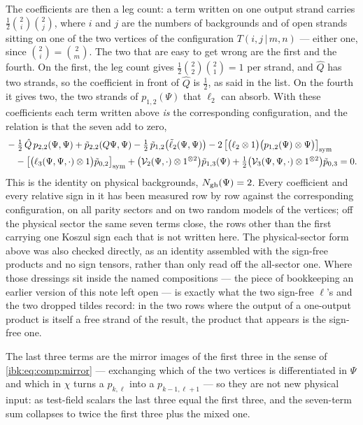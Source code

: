The coefficients are then a leg count: a term written on one output strand carries $\tfrac12\binom2i\binom2j$, where $i$ and $j$ are the numbers of backgrounds and of open strands sitting on one of the two vertices of the configuration $T(i,j\,|\,m,n)$ --- either one, since $\binom2i=\binom2m$. The two that are easy to get wrong are the first and the fourth. On the first, the leg count gives $\tfrac12\binom22\binom21=1$ per strand, and $\hat Q$ has two strands, so the coefficient in front of $\hat Q$ is $\tfrac12$, as said in the list. On the fourth it gives two, the two strands of $p_{1,2}(\Psi)$ that $\ell_2$ can absorb. With these coefficients each term written above \emph{is} the corresponding configuration, and the relation is that the seven add to zero,
\begin{equation}
  \label{ibk:eq:comp:22-map}
  \begin{split}
    &-\tfrac12\,\hat Q\,p_{2,2}(\Psi,\Psi)
      + \tilde p_{2,2}(Q\Psi,\Psi)
      - \tfrac12\,\tilde p_{1,2}\bigl(\tilde\ell_2(\Psi,\Psi)\bigr)
      - 2\,\bigl[\bigl(\ell_2\otimes1\bigr)\bigl(p_{1,2}(\Psi)\otimes\Psi\bigr)\bigr]_{\rm sym}
    \\
    &\quad
      - \bigl[\bigl(\ell_3(\Psi,\Psi,\cdot)\otimes1\bigr)\tilde p_{0,2}\bigr]_{\rm sym}
      + \bigl({\mathcal{V}}_2(\Psi,\cdot)\otimes1^{\otimes2}\bigr)\tilde p_{1,3}(\Psi)
      + \tfrac12\bigl({\mathcal{V}}_3(\Psi,\Psi,\cdot)\otimes1^{\otimes2}\bigr)\tilde p_{0,3}
      = 0.
  \end{split}
\end{equation}
This is the identity on physical backgrounds, $N_{\rm gh}(\Psi)=2$. Every coefficient and every relative sign in it has been measured row by row against the corresponding configuration, on all parity sectors and on two random models of the vertices; off the physical sector the same seven terms close, the rows other than the first carrying one Koszul sign each that is not written here. The physical-sector form above was also checked directly, as an identity assembled with the sign-free products and no sign tensors, rather than only read off the all-sector one.
Where those dressings sit inside the named compositions --- the piece of bookkeeping an earlier version of this note left open --- is exactly what the two sign-free $\ell$'s and the two dropped tildes record: in the two rows where the output of a one-output product is itself a free strand of the result, the product that appears is the sign-free one.

The last three terms are the mirror images of the first three in the sense of \eqref{ibk:eq:comp:mirror} --- exchanging which of the two vertices is differentiated in $\Psi$ and which in $\chi$ turns a $p_{k,\ell}$ into a $p_{k-1,\ell+1}$ --- so they are not new physical input: as test-field scalars the last three equal the first three, and the seven-term sum collapses to twice the first three plus the mixed one.

